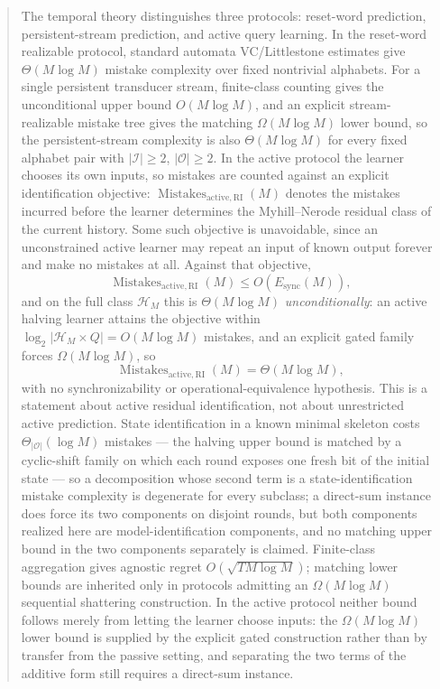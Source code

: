 \documentclass[12pt]{article}
\theoremstyle{definition}
\newcommand{\Esync}{E_{\mathrm{sync}}}
\newcommand{\MistRI}{\operatorname{Mistakes}_{\mathrm{active,RI}}}
\begin{document}
\begin{abstract}
The temporal theory distinguishes three protocols: reset-word prediction,
persistent-stream prediction, and active query learning.  In the reset-word
realizable protocol, standard automata VC/Littlestone estimates give
$\Theta(M\log M)$ mistake complexity over fixed nontrivial alphabets.  For a
single persistent transducer stream, finite-class counting gives the
unconditional upper bound $O(M\log M)$, and an explicit stream-realizable
mistake tree gives the matching $\Omega(M\log M)$ lower bound, so the
persistent-stream complexity is also $\Theta(M\log M)$ for every fixed
alphabet pair with $|\mathcal I|\ge2$, $|\mathcal O|\ge2$.  In the active protocol the learner chooses its own inputs, so mistakes are
counted against an explicit identification objective: $\MistRI(M)$ denotes the
mistakes incurred before the learner determines the Myhill--Nerode residual
class of the current history.  Some such objective is unavoidable, since an
unconstrained active learner may repeat an input of known output forever and
make no mistakes at all.  Against that objective,
\[
\MistRI(M)
\le
O(\Esync(M)),
\]
and on the full class $\mathcal H_M$ this is $\Theta(M\log M)$
\emph{unconditionally}: an active halving learner attains the objective within
$\log_2|\mathcal H_M\times Q|=O(M\log M)$ mistakes, and an explicit gated
family forces $\Omega(M\log M)$, so
\[
\MistRI(M)
=
\Theta(M\log M),
\]
with no synchronizability or operational-equivalence hypothesis.  This is a
statement about active residual identification, not about unrestricted active
prediction.
State identification in a known minimal skeleton costs
$\Theta_{|\mathcal O|}(\log M)$ mistakes --- the halving upper bound is matched
by a cyclic-shift family on which each round exposes one fresh bit of the
initial state --- so a decomposition whose second term is a
state-identification mistake complexity is degenerate for every subclass; a
direct-sum instance does force its two components on disjoint rounds, but both
components realized here are model-identification components, and no matching
upper bound in the two components separately is claimed.
Finite-class aggregation gives agnostic regret $O(\sqrt{T M\log M})$; matching
lower bounds are inherited only in protocols admitting an $\Omega(M\log M)$
sequential shattering construction.  In the active protocol neither bound
follows merely from letting the learner choose inputs: the $\Omega(M\log M)$
lower bound is supplied by the explicit gated construction rather than by
transfer from the passive setting, and separating the two terms of the additive
form still requires a direct-sum instance.


\end{abstract}
\end{document}
